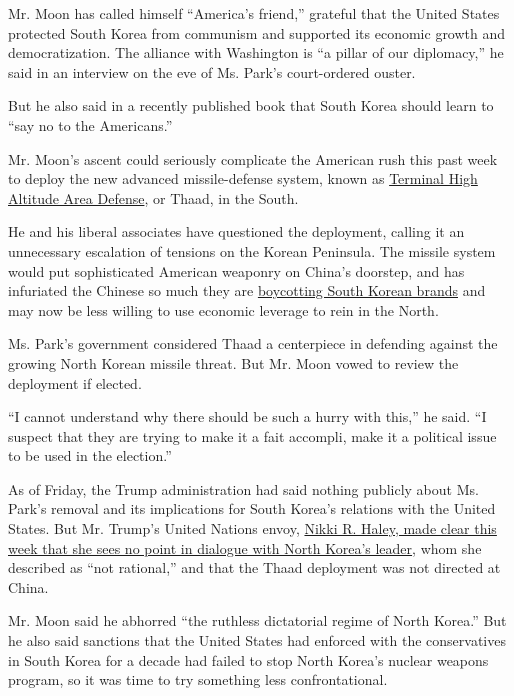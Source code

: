 Mr. Moon has called himself ``America's friend,'' grateful that the
United States protected South Korea from communism and supported its
economic growth and democratization. The alliance with Washington is ``a
pillar of our diplomacy,'' he said in an interview on the eve of Ms.
Park's court-ordered ouster.

But he also said in a recently published book that South Korea should
learn to ``say no to the Americans.''

Mr. Moon's ascent could seriously complicate the American rush this past
week to deploy the new advanced missile-defense system, known as
\href{https://www.mda.mil/system/thaad.html}{Terminal High Altitude Area
Defense}, or Thaad, in the South.

He and his liberal associates have questioned the deployment, calling it
an unnecessary escalation of tensions on the Korean Peninsula. The
missile system would put sophisticated American weaponry on China's
doorstep, and has infuriated the Chinese so much they are
\href{https://www.nytimes3xbfgragh.onion/2017/03/09/world/asia/china-lotte-thaad-south-korea.html}{boycotting
South Korean brands} and may now be less willing to use economic
leverage to rein in the North.

Ms. Park's government considered Thaad a centerpiece in defending
against the growing North Korean missile threat. But Mr. Moon vowed to
review the deployment if elected.

``I cannot understand why there should be such a hurry with this,'' he
said. ``I suspect that they are trying to make it a fait accompli, make
it a political issue to be used in the election.''

As of Friday, the Trump administration had said nothing publicly about
Ms. Park's removal and its implications for South Korea's relations with
the United States. But Mr. Trump's United Nations envoy,
\href{https://www.nytimes3xbfgragh.onion/2017/03/08/world/asia/china-north-korea-thaad-nuclear.html}{Nikki
R. Haley, made clear this week that she sees no point in dialogue with
North Korea's leader}, whom she described as ``not rational,'' and that
the Thaad deployment was not directed at China.

Mr. Moon said he abhorred ``the ruthless dictatorial regime of North
Korea.'' But he also said sanctions that the United States had enforced
with the conservatives in South Korea for a decade had failed to stop
North Korea's nuclear weapons program, so it was time to try something
less confrontational.

